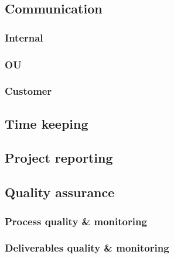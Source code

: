\subsection{Communication}
\lipsum[1]

\subsubsection{Internal}
\lipsum[1]

\subsubsection{OU}
\lipsum[1]

\subsubsection{Customer}
\lipsum[1]

\subsection{Time keeping}
\lipsum[1]

\subsection{Project reporting}
\lipsum[1]

\subsection{Quality assurance}
\lipsum[1]

\subsubsection{Process quality \& monitoring}
\lipsum[1]

\subsubsection{Deliverables quality \& monitoring}
\lipsum[1]
